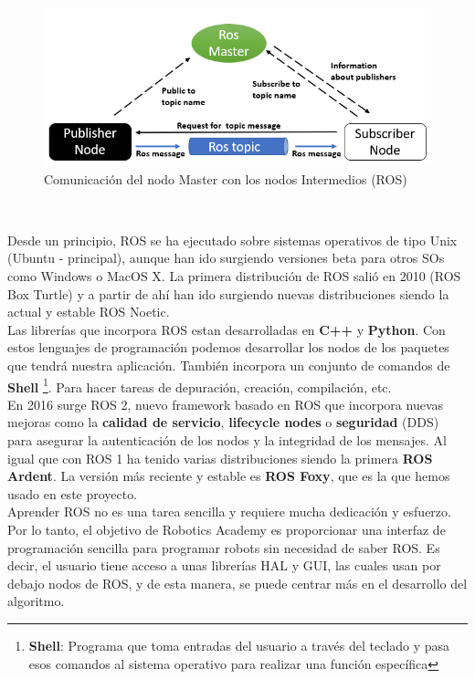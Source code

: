 \begin{figure} [H]
  \begin{center}
    \includegraphics[width=15cm]{imagenes/ros_master_communication.png}
  \end{center}
  \caption{Comunicación del nodo Master con los nodos Intermedios (ROS)}
  \label{fig:ros_master_comunicación}
\end{figure}\

Desde un principio, ROS se ha ejecutado sobre sistemas operativos de tipo Unix (Ubuntu - principal), aunque han ido surgiendo versiones beta para otros SOs como Windows o MacOS X. La primera distribución de ROS salió en 2010 (ROS Box Turtle) y a partir de ahí han ido surgiendo nuevas distribuciones siendo la actual y estable ROS Noetic.\\

Las librerías que incorpora ROS estan desarrolladas en \textbf{C++} y \textbf{Python}. Con estos lenguajes de programación podemos desarrollar los nodos de los paquetes que tendrá nuestra aplicación. También incorpora un conjunto de comandos de \textbf{Shell} \footnote{\textbf{Shell}: Programa que toma entradas del usuario a través del teclado y pasa esos comandos al sistema operativo para realizar una función específica}. Para hacer tareas de depuración, creación, compilación, etc.\\

En 2016 surge ROS 2, nuevo framework basado en ROS que incorpora nuevas mejoras como la \textbf{calidad de servicio}, \textbf{lifecycle nodes} o \textbf{seguridad} (DDS) para asegurar la autenticación de los nodos y la integridad de los mensajes. Al igual que con ROS 1 ha tenido varias distribuciones siendo la primera \textbf{ROS Ardent}. La versión más reciente y estable es \textbf{ROS Foxy}, que es la que hemos usado en este proyecto.\\

Aprender ROS no es una tarea sencilla y requiere mucha dedicación y esfuerzo. Por lo tanto, el objetivo de Robotics Academy es proporcionar una interfaz de programación sencilla para programar robots sin necesidad de saber ROS. Es decir, el usuario tiene acceso a unas librerías HAL y GUI, las cuales usan por debajo nodos de ROS, y de esta manera, se puede centrar más en el desarrollo del algoritmo.\\

